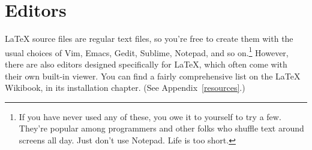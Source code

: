 \section{Editors}

\LaTeX{} source files are regular text files,
so you're free to create them with the usual choices of Vim, Emacs, Gedit,
Sublime, Notepad\plusplus, and so on.\punckern\footnote{If you have never used
any of these, you owe it to yourself to try a few.
They're popular among programmers and other folks who shuffle text around
screens all day. Just don't use Notepad. Life is too short.}
However, there are also editors designed specifically for \LaTeX{},
which often come with their own built-in  viewer.
You can find a fairly comprehensive list on the \LaTeX{} Wikibook,
in its installation chapter. (See Appendix~\ref{resources}.)
